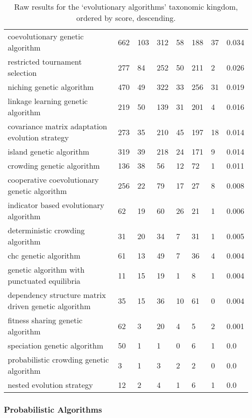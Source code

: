 \documentclass[a4paper, 11pt]{article}
\begin{document}
\begin{table}[ht]
\begin{tabularx}{\textwidth}{Xlllllll}
		coevolutionary genetic algorithm & 662 & 103 & 312 & 58 & 188 & 37 & 0.034 \\
		restricted tournament selection & 277 & 84 & 252 & 50 & 211 & 2 & 0.026 \\
		niching genetic algorithm & 470 & 49 & 322 & 33 & 256 & 31 & 0.019 \\
		linkage learning genetic algorithm & 219 & 50 & 139 & 31 & 201 & 4 & 0.016 \\
		covariance matrix adaptation evolution strategy & 273 & 35 & 210 & 45 & 197 & 18 & 0.014 \\
		island genetic algorithm & 319 & 39 & 218 & 24 & 171 & 9 & 0.014 \\
		crowding genetic algorithm & 136 & 38 & 56 & 12 & 72 & 1 & 0.011 \\
		cooperative coevolutionary genetic algorithm & 256 & 22 & 79 & 17 & 27 & 8 & 0.008 \\
		indicator based evolutionary algorithm & 62 & 19 & 60 & 26 & 21 & 1 & 0.006 \\
		deterministic crowding algorithm & 31 & 20 & 34 & 7 & 31 & 1 & 0.005 \\
		chc genetic algorithm & 61 & 13 & 49 & 7 & 36 & 4 & 0.004 \\
		genetic algorithm with punctuated equilibria & 11 & 15 & 19 & 1 & 8 & 1 & 0.004 \\
		dependency structure matrix driven genetic algorithm & 35 & 15 & 36 & 10 & 61 & 0 & 0.004 \\
		fitness sharing genetic algorithm & 62 & 3 & 20 & 4 & 5 & 2 & 0.001 \\
		speciation genetic algorithm & 50 & 1 & 1 & 0 & 6 & 1 & 0.0 \\
		probabilistic crowding genetic algorithm & 3 & 1 & 3 & 2 & 2 & 0 & 0.0 \\
		nested evolution strategy & 12 & 2 & 4 & 1 & 6 & 1 & 0.0 \\
		\bottomrule
		\end{tabularx}	
	\caption{Raw results for the `evolutionary algorithms' taxonomic kingdom, ordered by score, descending.}
	\label{tab:evolutionary}
\end{table}


\subsubsection{Probabilistic Algorithms}
\end{document}

